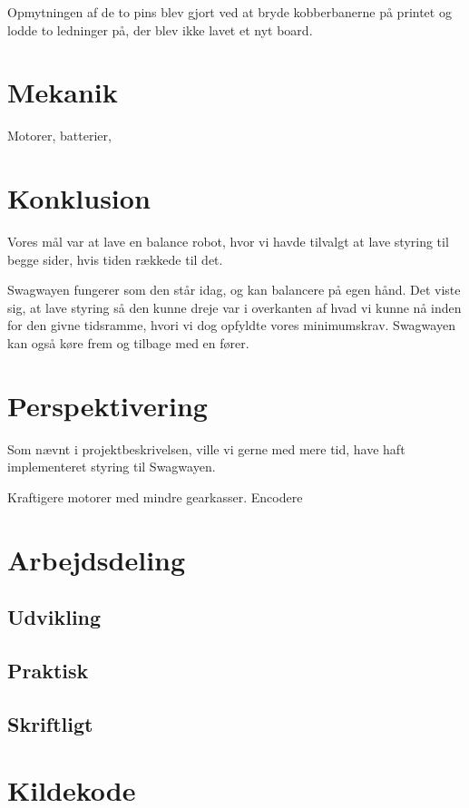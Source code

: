 \documentclass[a4paper,oneside,article,danish,table]{memoir}
\begin{document}
Opmytningen af de to pins blev gjort ved at bryde kobberbanerne på printet og lodde to ledninger på, der blev ikke lavet et nyt board.

\chapter{Mekanik}
Motorer, batterier, 
\chapter{Konklusion} \label{chap:kon}
Vores mål var at lave en balance robot, hvor vi havde tilvalgt at lave styring til begge sider, hvis tiden rækkede til det.

Swagwayen fungerer som den står idag, og kan balancere på egen hånd. Det viste sig, at lave styring så den kunne dreje var i overkanten af hvad vi kunne nå inden for den givne tidsramme, hvori vi dog opfyldte vores minimumskrav. Swagwayen kan også køre frem og tilbage med en fører.

\chapter{Perspektivering} \label{chap:per}
Som nævnt i projektbeskrivelsen, ville vi gerne med mere tid, have haft implementeret styring til Swagwayen. 

Kraftigere motorer med mindre gearkasser.
Encodere


\clearpage
\listoftables
\listoffigures
\nocite{*}
 
\clearpage \appendix

\chapter{Arbejdsdeling}

\section{Udvikling}
\section{Praktisk}
\section{Skriftligt}

\chapter{Kildekode}
\end{document}
